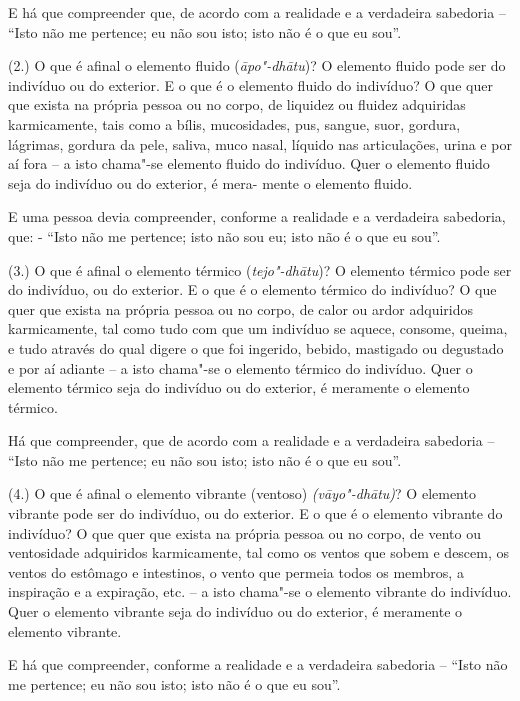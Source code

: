 E há que compreender que, de acordo com a realidade e a verdadeira sabedoria --
``Isto não me pertence; eu não sou isto; isto não é o que eu sou''.

(2.) O que é afinal o elemento fluido (\emph{āpo"-dhātu})? O elemento fluido pode
ser do indivíduo ou do exterior. E o que é o elemento fluido do indivíduo? O que
quer que exista na própria pessoa ou no corpo, de liquidez ou fluidez adquiridas
karmicamente, tais como a bílis, mucosidades, pus, sangue, suor, gordura,
lágrimas, gordura da pele, saliva, muco nasal, líquido nas articulações, urina e
por aí fora -- a isto chama"-se elemento fluido do indivíduo. Quer o elemento
fluido seja do indivíduo ou do exterior, é mera- mente o elemento fluido.

E uma pessoa devia compreender, conforme a realidade e a verdadeira sabedoria,
que: - ``Isto não me pertence; isto não sou eu; isto não é o que eu sou''.

(3.) O que é afinal o elemento térmico (\emph{tejo"-dhātu})? O elemento térmico
pode ser do indivíduo, ou do exterior. E o que é o elemento térmico do
indivíduo? O que quer que exista na própria pessoa ou no corpo, de calor ou
ardor adquiridos karmicamente, tal como tudo com que um indivíduo se aquece,
consome, queima, e tudo através do qual digere o que foi ingerido, bebido,
mastigado ou degustado e por aí adiante -- a isto chama"-se o elemento térmico do
indivíduo. Quer o elemento térmico seja do indivíduo ou do exterior, é meramente
o elemento térmico.

Há que compreender, que de acordo com a realidade e a verdadeira sabedoria --
``Isto não me pertence; eu não sou isto; isto não é o que eu sou''.

\enlargethispage{\baselineskip}

(4.) O que é afinal o elemento vibrante (ventoso) \emph{(vāyo"-dhātu)}? O
elemento vibrante pode ser do indivíduo, ou do exterior. E o que é o elemento
vibrante do indivíduo? O que quer que exista na própria pessoa ou no corpo, de
vento ou ventosidade adquiridos karmicamente, tal como os ventos que sobem e
descem, os ventos do estômago e intestinos, o vento que permeia todos os
membros, a inspiração e a expiração, etc. -- a isto chama"-se o elemento vibrante
do indivíduo. Quer o elemento vibrante seja do indivíduo ou do exterior, é
meramente o elemento vibrante.

E há que compreender, conforme a realidade e a verdadeira sabedoria -- ``Isto
não me pertence; eu não sou isto; isto não é o que eu sou''.

